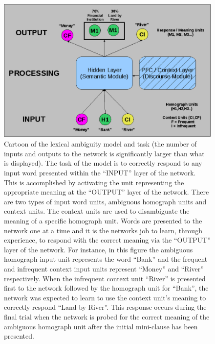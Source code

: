 \begin{figure}[tp]
\begin{center}
	\includegraphics[width=115mm]{figures/lexAmb_network_cartoon.eps}
\end{center}
\caption{Cartoon of the lexical ambiguity model and task (the number of inputs and outputs to the network is significantly larger than what is displayed).  The task of the model is to correctly respond to any input word presented within the ``INPUT'' layer of the network.  This is accomplished by activating the unit representing the appropriate meaning at the ``OUTPUT'' layer of the network.  There are two types of input word units, ambiguous homograph units and context units. The context units are used to disambiguate the meaning of a specific homograph unit.  Words are presented to the network one at a time and it is the networks job to learn, through experience, to respond with the correct meaning via the ``OUTPUT'' layer of the network.  For instance, in this figure the ambiguous homograph input unit represents the word ``Bank'' and the frequent and infrequent context input units represent ``Money'' and ``River'' respectively.  When the infrequent context unit ``River'' is presented first to the network followed by the homograph unit for ``Bank'', the network was expected to learn to use the context unit's meaning to correctly respond ``Land by River''.  This response occurs during the final trial when the network is probed for the correct meaning of the ambiguous homograph unit after the initial mini-clause has been presented.}
\label{lexamb-model-task}
\end{figure} 

